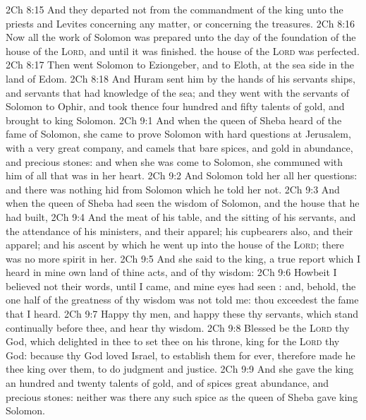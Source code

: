\vs 2Ch 8:15 And they departed not from the commandment of the king unto the priests and Levites concerning any matter, or concerning the treasures.
\vs 2Ch 8:16 Now all the work of Solomon was prepared unto the day of the foundation of the house of the \textsc{Lord}, and until it was finished.  the house of the \textsc{Lord} was perfected.
\vs 2Ch 8:17 Then went Solomon to Eziongeber, and to Eloth, at the sea side in the land of Edom.
\vs 2Ch 8:18 And Huram sent him by the hands of his servants ships, and servants that had knowledge of the sea; and they went with the servants of Solomon to Ophir, and took thence four hundred and fifty talents of gold, and brought  to king Solomon.
\vs 2Ch 9:1 And when the queen of Sheba heard of the fame of Solomon, she came to prove Solomon with hard questions at Jerusalem, with a very great company, and camels that bare spices, and gold in abundance, and precious stones: and when she was come to Solomon, she communed with him of all that was in her heart.
\vs 2Ch 9:2 And Solomon told her all her questions: and there was nothing hid from Solomon which he told her not.
\vs 2Ch 9:3 And when the queen of Sheba had seen the wisdom of Solomon, and the house that he had built,
\vs 2Ch 9:4 And the meat of his table, and the sitting of his servants, and the attendance of his ministers, and their apparel; his cupbearers also, and their apparel; and his ascent by which he went up into the house of the \textsc{Lord}; there was no more spirit in her.
\vs 2Ch 9:5 And she said to the king,  a true report which I heard in mine own land of thine acts, and of thy wisdom:
\vs 2Ch 9:6 Howbeit I believed not their words, until I came, and mine eyes had seen : and, behold, the one half of the greatness of thy wisdom was not told me:  thou exceedest the fame that I heard.
\vs 2Ch 9:7 Happy  thy men, and happy  these thy servants, which stand continually before thee, and hear thy wisdom.
\vs 2Ch 9:8 Blessed be the \textsc{Lord} thy God, which delighted in thee to set thee on his throne,  king for the \textsc{Lord} thy God: because thy God loved Israel, to establish them for ever, therefore made he thee king over them, to do judgment and justice.
\vs 2Ch 9:9 And she gave the king an hundred and twenty talents of gold, and of spices great abundance, and precious stones: neither was there any such spice as the queen of Sheba gave king Solomon.
